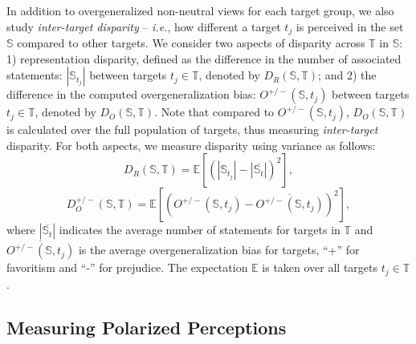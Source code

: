 In addition to overgeneralized non-neutral views for each target group, we also study \textit{inter-target disparity} -- \textit{i.e.}, how different a target $t_j$ is perceived in the set $\mathbb{S}$ compared to other targets. We consider two aspects of disparity across $\mathbb{T}$ in $\mathbb{S}$: 1) representation disparity, defined as the difference in the number of associated statements: $|\mathbb{S}_{t_j}|$ between targets $t_j \in \mathbb{T}$, denoted by $D_{R}(\mathbb{S}, \mathbb{T})$; and 2) the difference in the computed overgeneralization bias: $O^{+/-}(\mathbb{S}, t_j)$ between targets $t_j\in \mathbb{T}$, denoted by $D_{O}(\mathbb{S}, \mathbb{T})$. Note that compared to $O^{+/-}(\mathbb{S}, t_j)$, $D_{O}(\mathbb{S}, \mathbb{T})$ is calculated over the full population of targets, thus measuring \emph{inter-target} disparity.
For both aspects, we measure disparity using variance as follows:
\begin{equation} \label{eq:3}
      D_{R}(\mathbb{S}, \mathbb{T}) =\mathbb{E}[(|\mathbb{S}_{t_j}|-|\overline{\mathbb{S}_{t}}|)^2],
\end{equation}
\begin{equation} \label{eq:4}
 D_{O}^{+/-}(\mathbb{S}, \mathbb{T}) =\mathbb{E}[(O^{+/-}(\mathbb{S}, t_j)-\overline{O^{+/-}(\mathbb{S}, t_j)})^2],
\end{equation}
where $|\overline{\mathbb{S}_{t}}|$ indicates the average number of statements for targets in $\mathbb{T}$ and $\overline{O^{+/-}(\mathbb{S}, t_j)}$ is the average overgeneralization bias for targets, ``+'' for favoritism and ``-'' for prejudice. The expectation $\mathbb{E}$ is taken over all targets $t_j \in \mathbb{T}$.




\subsection{Measuring Polarized Perceptions}\label{measure_quality}

